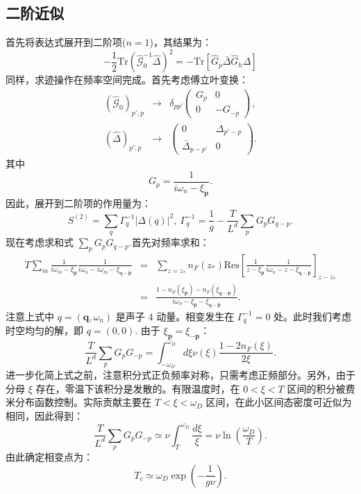 \documentclass[10pt,UTF8]{ctexart}
\begin{document}
\subsection*{二阶近似}
\noindent 首先将表达式展开到二阶项($n=1$)，其结果为：
\begin{equation}
	-\frac{1}{2} \mathrm{Tr}(\hat{\mathcal G}_0^{-1}\hat\Delta)^2
	= - \mathrm{Tr}[\hat G_p \bar\Delta \hat G_h \Delta]
\end{equation}
同样，求迹操作在频率空间完成。首先考虑傅立叶变换：
\begin{eqnarray}
	(\hat{\mathcal G}_0)_{p',p}
	& \longrightarrow &
	\delta_{pp'}\left( 
	\begin{array}{cc}
		G_p & 0\\
		0 & -G_{-p}
	\end{array}
	\right), \\
	(\hat \Delta)_{p',p}
	& \longrightarrow &
	\left( 
	\begin{array}{cc}
		0 & \Delta_{p'-p} \\
		\bar\Delta_{p-p'} & 0
	\end{array}
	\right).
\end{eqnarray}
其中
\begin{equation}
	G_p = \frac{1}{i\omega_n-\xi_{\bm p}}.
\end{equation}
因此，展开到二阶项的作用量为：
\begin{equation}
	S^{(2)}=\sum_q \Gamma_q^{-1}|\Delta(q)|^2,\ 
	\Gamma_q^{-1}=\frac{1}{g}-\frac{T}{L^d}\sum_p G_p G_{q-p}.
\end{equation}
现在考虑求和式 $\sum_p G_p G_{q-p} $.首先对频率求和：
\begin{eqnarray}
	T\sum_{m} \frac{1}{i\omega_m-\xi_{\bm p}}\frac{1}{i\omega_n-i\omega_m-\xi_{\bm q-\bm p}}
	&=& \sum_{z=z_*} n_F(z_*) \mathrm{Res} \left[\frac{1}{z-\xi_{\bm p}}\frac{1}{i\omega_n-z-\xi_{\bm q-\bm p}} \right]_{z-z_*} \nonumber \\
	&=& \frac{1-n_F(\xi_{\bm p})-n_F(\xi_{\bm q-\bm p})}{i\omega_n-\xi_{\bm p}-\xi_{\bm q-\bm p}}.
\end{eqnarray}
注意上式中 $q = (\bm q,\omega_n)$ 是声子 4 动量。相变发生在 $\Gamma_q^{-1}=0$ 处。此时我们考虑时空均匀的解，即 $q=(0,0)$. 由于 $\xi_{\bm p}=\xi_{-\bm p}$：
\begin{equation}
	\frac{T}{L^d}\sum_p G_p G_{-p}
	= \int_{-\omega_D}^{\omega_D} d\xi \nu(\xi)\frac{1-2n_F(\xi)}{2\xi}.
\end{equation}
进一步化简上式之前，注意积分式正负频率对称，只需考虑正频部分。另外，由于分母 $\xi$ 存在，零温下该积分是发散的。有限温度时，在 $0 < \xi < T$ 区间的积分被费米分布函数控制。实际贡献主要在 $T < \xi < \omega_D$ 区间，在此小区间态密度可近似为相同，因此得到：
\begin{equation}
	\frac{T}{L^d}\sum_p G_p G_{-p} \simeq \nu \int_T^{\omega_D} \frac{d\xi}{\xi}
	= \nu \ln\left( \frac{\omega_D}{T} \right).
\end{equation}
由此确定相变点为：
\begin{equation}
	T_c \simeq \omega_D \exp\left( -\frac{1}{g\nu} \right).
\end{equation}
\end{document}
